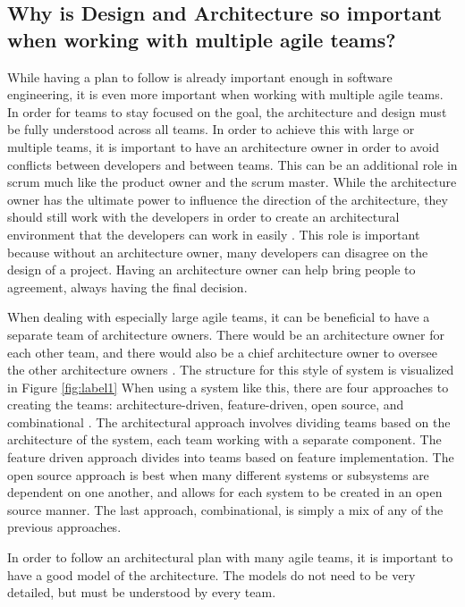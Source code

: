 \documentclass[sigplan,screen]{acmart}
\begin{document}
\subsection{Why is Design and Architecture so important when working with multiple agile teams?}
While having a plan to follow is already important enough in software engineering, it is even more important when working with multiple agile teams. In order for teams to stay focused on the goal, the architecture and design must be fully understood across all teams.
In order to achieve this with large or multiple teams, it is important to have an architecture owner in order to avoid conflicts between developers and between teams. This can be an additional role in scrum much like the product owner and the scrum master. While the architecture owner has the ultimate power to influence the direction of the architecture, they should still work with the developers in order to create an architectural environment that the developers can work in easily \cite{WAmbler}. This role is important because without an architecture owner, many developers can disagree on the design of a project. Having an architecture owner can help bring people to agreement, always having the final decision. \par
When dealing with especially large agile teams, it can be beneficial to have a separate team of architecture owners. There would be an architecture owner for each other team, and there would also be a chief architecture owner to oversee the other architecture owners \cite{WAmbler}. The structure for this style of system is visualized in Figure \ref{fig:label1} When using a system like this, there are four approaches to creating the teams: architecture-driven, feature-driven, open source, and combinational \cite{WAmbler}.
The architectural approach involves dividing teams based on the architecture of the system, each team working with a separate component. The feature driven approach divides into teams based on feature implementation. The open source approach is best when many different systems or subsystems are dependent on one another, and allows for each system to be created in an open source manner. The last approach, combinational, is simply a mix of any of the previous approaches. \par
In order to follow an architectural plan with many agile teams, it is important to have a good model of the architecture. The models do not need to be very detailed, but must be understood by every team.
\end{document}
